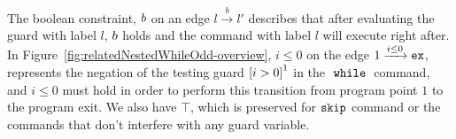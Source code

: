 
The boolean constraint, $b$ on an edge $l \xrightarrow{b} l'$ describes
that after evaluating the guard with label $l$,
$b$ holds and the command with label $l$ will execute right after.
In Figure~\ref{fig:relatedNestedWhileOdd-overview}, $i \leq 0 $ on the edge $1 \xrightarrow{i \leq 0} \mathtt{ex}$, 
represents the negation of the testing guard $\clabel{i > 0}^1$
in the $\;\mathtt{while}\;$ command, and $i \leq 0$ must hold in order to perform this transition from program point $1$ to
the program exit. 
We also have $\top$, which is preserved for $\mathtt{skip}$ command or the commands that don't interfere with any guard variable.



